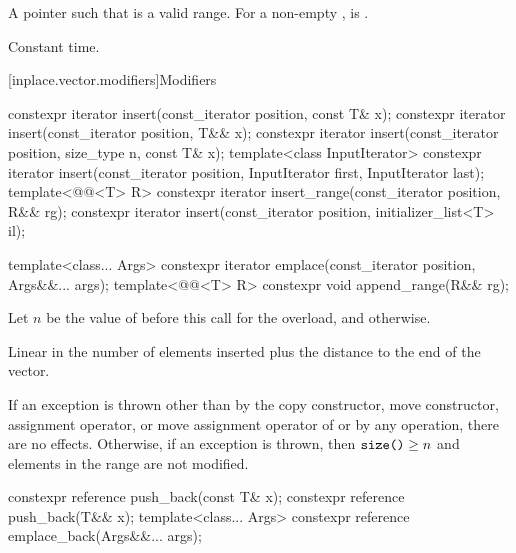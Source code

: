 \begin{itemdescr}
\pnum
\returns
A pointer such that  is a valid range.
For a non-empty ,
 is .

\pnum
\complexity
Constant time.
\end{itemdescr}

[inplace.vector.modifiers]{Modifiers}

%
%
%
%
\begin{itemdecl}
constexpr iterator insert(const_iterator position, const T& x);
constexpr iterator insert(const_iterator position, T&& x);
constexpr iterator insert(const_iterator position, size_type n, const T& x);
template<class InputIterator>
  constexpr iterator insert(const_iterator position, InputIterator first, InputIterator last);
template<@@<T> R>
  constexpr iterator insert_range(const_iterator position, R&& rg);
constexpr iterator insert(const_iterator position, initializer_list<T> il);

template<class... Args>
  constexpr iterator emplace(const_iterator position, Args&&... args);
template<@@<T> R>
  constexpr void append_range(R&& rg);
\end{itemdecl}

\begin{itemdescr}
\pnum
Let $n$ be the value of  before this call for
the  overload, and
 otherwise.

\pnum
\complexity
Linear in the number of elements inserted plus
the distance to the end of the vector.

\pnum
\remarks
If an exception is thrown other than by the
copy constructor,
move constructor,
assignment operator, or
move assignment operator
of  or by
any  operation,
there are no effects.
Otherwise,
if an exception is thrown, then
$\texttt{\protect size()} \ge n$ and
elements in the range  are not modified.
\end{itemdescr}

%
%
\begin{itemdecl}
constexpr reference push_back(const T& x);
constexpr reference push_back(T&& x);
template<class... Args>
  constexpr reference emplace_back(Args&&... args);
\end{itemdecl}

